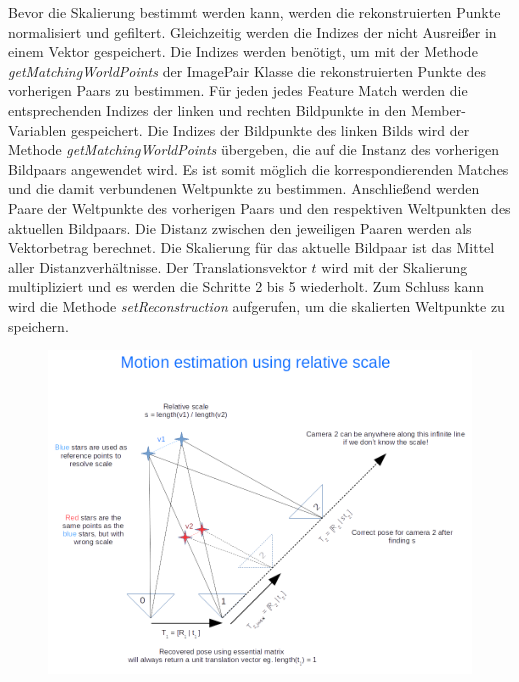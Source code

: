 Bevor die Skalierung bestimmt werden kann, werden die rekonstruierten Punkte normalisiert und gefiltert.
Gleichzeitig werden die Indizes der nicht Ausreißer in einem Vektor gespeichert. 
Die Indizes werden benötigt, um mit der Methode \emph{getMatchingWorldPoints} der ImagePair Klasse die rekonstruierten Punkte des vorherigen Paars zu bestimmen.
Für jeden jedes Feature Match werden die entsprechenden Indizes der linken und rechten Bildpunkte in den Member-Variablen gespeichert.
Die Indizes der Bildpunkte des linken Bilds wird der Methode \emph{getMatchingWorldPoints} übergeben, die auf die Instanz des vorherigen Bildpaars angewendet wird.
Es ist somit möglich die korrespondierenden Matches und die damit verbundenen Weltpunkte zu bestimmen.
Anschließend werden Paare der Weltpunkte des vorherigen Paars und den respektiven Weltpunkten des
aktuellen Bildpaars.
Die Distanz zwischen den jeweiligen Paaren werden als Vektorbetrag berechnet.
Die Skalierung für das aktuelle Bildpaar ist das Mittel aller Distanzverhältnisse.
Der Translationsvektor $t$ wird mit der Skalierung multipliziert und es werden die Schritte 2 bis 5 wiederholt.
Zum Schluss kann wird die Methode \emph{setReconstruction} aufgerufen, um die skalierten Weltpunkte zu speichern.
\begin{figure}
    \includegraphics[width=\textwidth]{src/img/nghiaho_2017_sfm_scaling}
    \caption{~\cite{nghiaho_2017}}
    \label{fig:sfm-scaling}
\end{figure}
